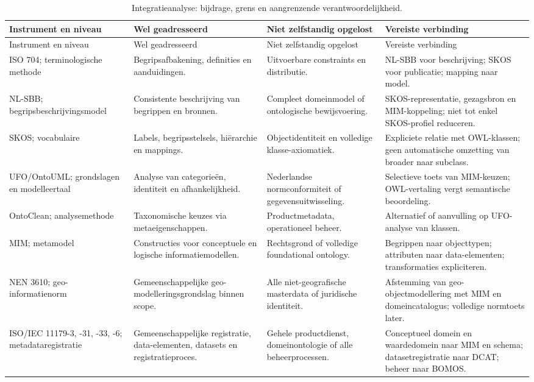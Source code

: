 \begingroup\small
\begin{longtable}{@{}P{.22\linewidth}P{.22\linewidth}P{.24\linewidth}P{.24\linewidth}@{}}
\caption{Integratieanalyse: bijdrage, grens en aangrenzende verantwoordelijkheid.}\label{tab:cross}\\
\toprule Instrument en niveau & Wel geadresseerd & Niet zelfstandig opgelost & Vereiste verbinding \\ \midrule\endfirsthead
\toprule Instrument en niveau & Wel geadresseerd & Niet zelfstandig opgelost & Vereiste verbinding \\ \midrule\endhead
ISO 704; terminologische methode \citep{S11} & Begripsafbakening, definities en aanduidingen. & Uitvoerbare constraints en distributie. & NL-SBB voor beschrijving; SKOS voor publicatie; mapping naar model. \\
NL-SBB; begrips\-beschrijvings\-model \citep{S14} & Consistente beschrijving van begrippen en bronnen. & Compleet domeinmodel of ontologische bewijsvoering. & SKOS-representatie, gezagsbron en MIM-koppeling; niet tot enkel SKOS-profiel reduceren. \\
SKOS; vocabulaire \citep{S31} & Labels, begripsstelsels, hiërarchie en mappings. & Objectidentiteit en volledige klasse-axiomatiek. & Expliciete relatie met OWL-klassen; geen automatische omzetting van broader naar subclass. \\
UFO/OntoUML; grondslagen en modelleertaal \citep{S40,S41,L09} & Analyse van categorieën, identiteit en afhankelijkheid. & Nederlandse normconformiteit of gegevensuitwisseling. & Selectieve toets van MIM-keuzen; OWL-vertaling vergt semantische beoordeling. \\
OntoClean; analysemethode \citep{L10} & Taxonomische keuzes via metaeigenschappen. & Productmetadata, operationeel beheer. & Alternatief of aanvulling op UFO-analyse van klassen. \\
MIM; metamodel \citep{S13} & Constructies voor conceptuele en logische informatiemodellen. & Rechtsgrond of volledige foundational ontology. & Begrippen naar objecttypen; attributen naar data-elementen; transformaties expliciteren. \\
NEN 3610; geo-informatienorm \citep{S17} & Gemeenschappelijke geo-modellerings\-grondslag binnen scope. & Alle niet-geografische masterdata of juridische identiteit. & Afstemming van geo-objectmodellering met MIM en domeincatalogus; volledige normtoets later. \\
ISO/IEC 11179-3, -31, -33, -6; metadata\-registratie \citep{S07,S08,S09,S10} & Gemeenschappelijke registratie, data-elementen, datasets en registratieproces. & Gehele productdienst, domeinontologie of alle beheerprocessen. & Conceptueel domein en waardedomein naar MIM en schema; datasetregistratie naar DCAT; beheer naar BOMOS. \\

\end{longtable}
